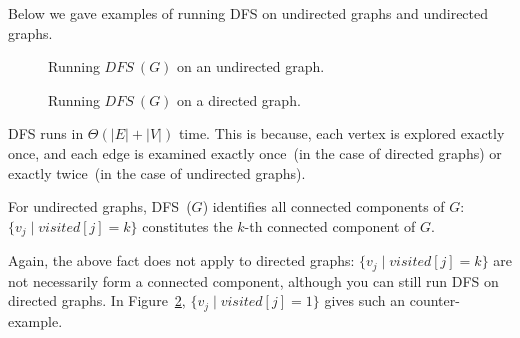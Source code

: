 \begin{algorithmblock}[0.8\textwidth]
	\xxx
	\xxx
	\xxx
	\xxx
	\xxx
	\xxx
	\xxx
\end{algorithmblock}


\begin{algorithmblock}[0.8\textwidth]
	\xxx
	\xxx
	\xxx
	\xxx
\end{algorithmblock}

Below we gave examples of running DFS on undirected graphs and undirected graphs.

\begin{figure}[h!]
\centering{}
\caption{Running $DFS~(G)$ on an undirected graph.}
\label{fig:dfs-undirected}
\end{figure}

\begin{figure}[h!]
\centering{}
\caption{Running $DFS~(G)$ on a directed graph.}
\label{fig:dfs-directed}
\end{figure}

DFS runs in $\Theta(|E| + |V|)$ time. This is because, each vertex
is explored exactly once, and each edge is examined exactly once~(in the case of directed graphs)
or exactly twice~(in the case of undirected graphs).

\begin{fact}
For undirected graphs, DFS~($G$) identifies all connected components of $G$:
	$\{v_j \mid visited[j] = k \}$ constitutes the $k$-th connected component of $G$.
\end{fact}

Again, the above fact does not apply to directed graphs: $\{v_j \mid visited[j] = k\}$
are not necessarily form a connected component, although you can still run DFS on directed graphs. In
Figure~\ref{fig:dfs-directed}, $\{v_j \mid visited[j] = 1\}$ gives such an counter-example. 
